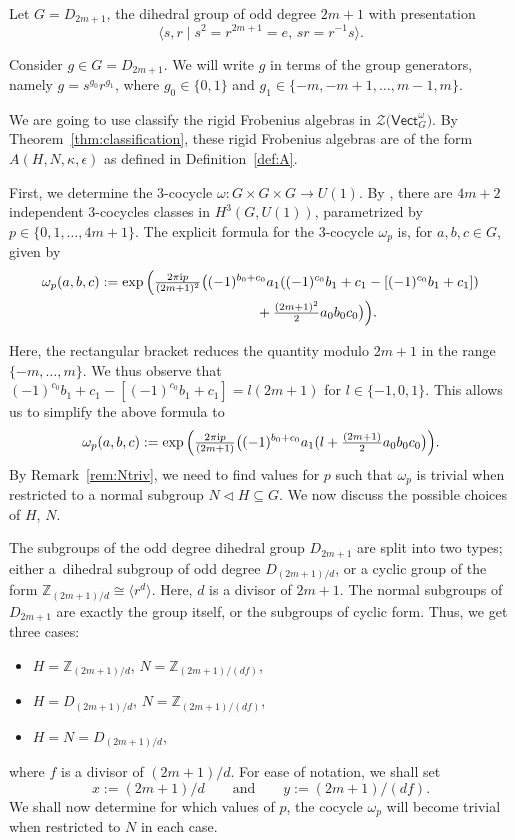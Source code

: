 \documentclass[pdftex]{sigma}
\numberwithin{equation}{section}
\newcommand{\Vect}{\mathsf{Vect}}
\newcommand{\mZ}{\mathbb{Z}}
\newcommand{\cZ}{\mathcal{Z}}
\begin{document}
Let $G = D_{2m+1}$, the dihedral group of odd degree $2m +1$ with presentation
\[\big\langle s,r \mid s^2 = r^{2m+1} = e ,\, sr = r^{-1}s \big\rangle.\]
\begin{Notation}
 Consider $g \in G=D_{2m+1}$. We will write $g$ in terms of the group generators, namely $g=s^{g_0}r^{g_1}$, where $g_0\in \lbrace 0,1 \rbrace$ and $g_1 \in \lbrace -m, -m+1, \dots , m-1, m \rbrace$.
\end{Notation}

We are going to use classify the rigid Frobenius algebras in $\cZ\big(\Vect_G^\omega\big)$.
By Theorem~\ref{thm:classification}, these rigid Frobenius algebras are of the form $A(H,N,\kappa,\epsilon)$ as defined in Definition~\ref{def:A}.

First, we determine the $3$-cocycle $\omega\colon G\times G \times G \to U(1)$.
By \cite[equation~3.2.8]{dWP}, there are $4m+2$ independent $3$-cocycles classes in $H^3(G,U(1))$, parametrized by $p \in \lbrace 0,1,\dots , 4m+1 \rbrace$. The explicit formula for the $3$-cocycle $\omega_p$ is, for $a,b,c \in G$, given by{\samepage
\begin{gather}
 \omega_p(a,b,c) :=\exp\Big(\tfrac{2\pi {\rm i} p}{(2m+1)^2}\big((-1)^{b_0+c_0}a_1((-1)^{c_0}b_1+c_1 - [(-1)^{c_0}b_1+c_1]) \nonumber\\
 \hphantom{\omega_p(a,b,c) :=\exp\Big(}{} + \tfrac{(2m+1)^2}{2}a_0b_0c_0\big) \Big).\label{eq:omega_p}
\end{gather}}

\noindent
Here, the rectangular bracket reduces the quantity modulo $2m+1$ in the range $\lbrace -m,\dots ,m \rbrace$.
We thus observe that $(-1)^{c_0}b_1+c_1 - [(-1)^{c_0}b_1+c_1] = l(2m+1)$ for $l\in \lbrace -1,0,1 \rbrace$. This allows us to simplify the above formula to
\begin{equation*}%
 \omega_p(a,b,c) :=\exp\Big(\tfrac{2\pi {\rm i} p}{(2m+1)}\big((-1)^{b_0+c_0}a_1(l + \tfrac{(2m+1)}{2}a_0b_0c_0\big) \Big).
\end{equation*}
By Remark~\ref{rem:Ntriv}, we need to find values for $p$ such that $\omega_p$ is trivial when restricted to a normal subgroup $N\triangleleft H \subseteq G$. We now discuss the possible choices of $H$, $N$.

The subgroups of the odd degree dihedral group $D_{2m+1}$ are split into two types; either a~dihedral subgroup of odd degree $D_{(2m+1)/d}$, or a cyclic group of the form $\mZ_{(2m+1)/d} \cong \langle r^{d}\rangle$. Here, $d$ is a divisor of $2m+1$.
The normal subgroups of $D_{2m+1}$ are exactly the group itself, or the subgroups of cyclic form. Thus, we get three cases:
\begin{itemize}\itemsep=0pt
 \item $H= \mZ_{(2m+1)/d}$, $N= \mZ_{(2m+1)/(df)}$,
 \item $H=D_{(2m+1)/d}$, $N = \mZ_{(2m+1)/(df)}$,
 \item $H=N=D_{(2m+1)/d}$,
\end{itemize}
where $f$ is a divisor of $(2m+1)/d$. For ease of notation, we shall set
\[x:=(2m+1)/d \qquad \text{and}\qquad y:=(2m+1)/(df).\]
We shall now determine for which values of $p$, the cocycle $\omega_p$ will become trivial when restricted to $N$ in each case.
\end{document}
